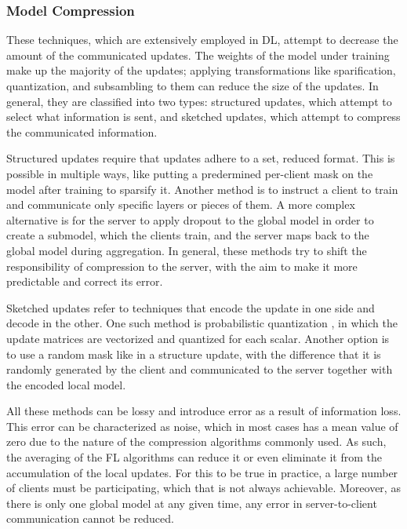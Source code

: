 \subsubsection{Model Compression}
These techniques, which are extensively employed in DL, attempt to decrease the amount of the communicated updates. The weights of the model under training make up the majority of the updates; applying transformations like sparification, quantization, and subsambling to them can reduce the size of the updates. In general, they are classified into two types: structured updates, which attempt to select what information is sent, and sketched updates, which attempt to compress the communicated information.

Structured updates require that updates adhere to a set, reduced format. This is possible in multiple ways, like putting a predermined per-client mask on the model after training to sparsify it. Another method is to instruct a client to train and communicate only specific layers or pieces of them. A more complex alternative is for the server to apply dropout to the global model in order to create a submodel, which the clients train, and the server maps back to the global model during aggregation. In general, these methods try to shift the responsibility of compression to the server, with the aim to make it more predictable and correct its error.

Sketched updates refer to techniques that encode the update in one side and decode in the other. One such method is probabilistic quantization \cite{probabilistic_quantization}, in which the update matrices are vectorized and quantized for each scalar. Another option is to use a random mask like in a structure update, with the difference that it is randomly generated by the client and communicated to the server together with the encoded local model.

All these methods can be lossy and introduce error as a result of information loss. This error can be characterized as noise, which in most cases has a mean value of zero due to the nature of the compression algorithms commonly used. As such, the averaging of the FL algorithms can reduce it or even eliminate it from the accumulation of the local updates. For this to be true in practice, a large number of clients must be participating, which that is not always achievable. Moreover, as there is only one global model at any given time, any error in server-to-client communication cannot be reduced.


